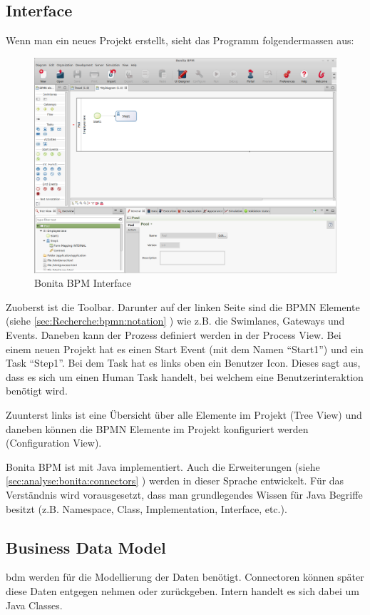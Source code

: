\subsection{Interface}
Wenn man ein neues Projekt erstellt, sieht das Programm folgendermassen aus:
\begin{figure}[H]
	\centering
	\includegraphics[width=1\textwidth]{images/bonita.png}
	\caption{Bonita BPM Interface}
	\label{fig:analyse:bonita:interface}
\end{figure}
Zuoberst ist die Toolbar. Darunter auf der linken Seite sind die BPMN Elemente (siehe \cref{sec:Recherche:bpmn:notation} ) wie z.B. die Swimlanes, Gateways und Events. Daneben kann der Prozess definiert werden in der Process View. Bei einem neuen Projekt hat es einen Start Event (mit dem Namen "`Start1"') und ein Task "`Step1"'. Bei dem Task hat es links oben ein Benutzer Icon. Dieses sagt aus, dass es sich um einen Human Task handelt, bei welchem eine Benutzerinteraktion benötigt wird.

Zuunterst links ist eine Übersicht über alle Elemente im Projekt (Tree View) und daneben können die BPMN Elemente im Projekt konfiguriert werden (Configuration View).

Bonita BPM ist mit Java implementiert. Auch die Erweiterungen (siehe \cref{sec:analyse:bonita:connectors} ) werden in dieser Sprache entwickelt. Für das Verständnis wird vorausgesetzt, dass man grundlegendes Wissen für Java Begriffe besitzt (z.B. Namespace, Class, Implementation, Interface, etc.).

\subsection{Business Data Model}
\gls{bdm} werden für die Modellierung der Daten benötigt. Connectoren können später diese Daten entgegen nehmen oder zurückgeben. Intern handelt es sich dabei um Java Classes.

